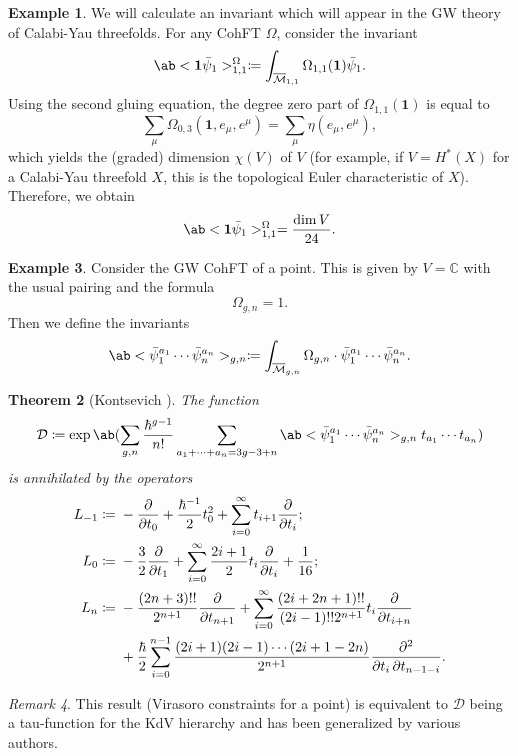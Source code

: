\documentclass{amsart}
\newtheorem{thm}{Theorem}[section]
\theoremstyle{definition}
\newtheorem{exm}[thm]{Example}
\theoremstyle{remark}
\newtheorem{rmk}[thm]{Remark}
\theoremstyle{plain}
\theoremstyle{definition}
\theoremstyle{remark}
\newcommand{\C}{\mathbb{C}}
\newcommand{\Mbar}{\overline{\mathcal{M}}}
\newcommand{\mc}[1]{\mathcal{#1}}
\newcommand{\1}{\mathbf{1}}
\newcommand{\2}{\mathbf{2}}
\newcommand{\3}{\mathbf{3}}
\begin{document}
\begin{exm}
    We will calculate an invariant which will appear in the GW theory of Calabi-Yau threefolds. For any CohFT $\Omega$, consider the invariant
    \[ \ab<\1\bar{\psi}_1>_{1,1}^{\Omega}\coloneqq \int_{\Mbar_{1,1}} \Omega_{1,1}(\1)\bar{\psi}_1. \]
    Using the second gluing equation, the degree zero part of $\Omega_{1,1}(\1)$ is equal to
    \[ \sum_{\mu} \Omega_{0,3}(\1, e_{\mu}, e^{\mu}) = \sum_{\mu} \eta(e_{\mu}, e^{\mu}), \]
    which yields the (graded) dimension $\chi(V)$ of $V$ (for example, if \(V = H^*(X)\) for a Calabi-Yau threefold \(X\), this is the topological Euler characteristic of \(X\)). Therefore, we obtain
    \[ \ab<\1\bar{\psi}_1>_{1,1}^{\Omega} = \frac{\dim V}{24}. \]
\end{exm}

\begin{exm}
    Consider the GW CohFT of a point. This is given by $V = \C$ with the usual pairing and the formula 
    \[ \Omega_{g,n} = 1. \]
    Then we define the invariants
    \[ \ab<\bar{\psi}_1^{a_1} \cdots \bar{\psi}_n^{a_n}>_{g,n} \coloneqq \int_{\Mbar_{g,n}} \Omega_{g,n} \cdot \bar{\psi}_1^{a_1} \cdots \bar{\psi}_n^{a_n}. \]
    \begin{thm}[Kontsevich {\cite{Kontsevich1992}}]
        The function
        \[ \mc{D} \coloneqq \exp \ab(\sum_{g,n} \frac{\hbar^{g-1}}{n!}\sum_{a_1 + \cdots + a_n = 3g-3+n} \ab<\bar{\psi}_1^{a_1} \cdots \bar{\psi}_n^{a_n}>_{g,n} t_{a_1}\cdots t_{a_n}) \]
        is annihilated by the operators
        \begin{align*}
            L_{-1} \coloneqq{}& -\pdv{}{t_0} + \frac{\hbar^{-1}}{2} t_0^2 + \sum_{i=0}^{\infty} t_{i+1} \pdv{}{t_i};\\
            L_0 \coloneqq{}& -\frac{3}{2} \pdv{}{t_1} + \sum_{i=0}^{\infty} \frac{2i+1}{2} t_i \pdv{}{t_i} + \frac{1}{16};\\
            L_n \coloneqq{}& -\frac{(2n+3)!!}{2^{n+1}} \pdv{}{t_{n+1}} + \sum_{i=0}^{\infty} \frac{(2i+2n+1)!!}{(2i-1)!! 2^{n+1}} t_i \pdv{}{t_{i+n}} \\
            &+ \frac{\hbar}{2} \sum_{i=0}^{n-1} \frac{(2i+1) (2i-1) \cdots (2i+1-2n)}{2^{n+1}} \pdv{}{t_i,t_{n-1-i}}.
        \end{align*}
    \end{thm}
\end{exm}

\begin{rmk}
    This result (Virasoro constraints for a point) is equivalent to $\mc{D}$ being a tau-function for the KdV hierarchy and has been generalized by various authors.
\end{rmk}
\end{document}
